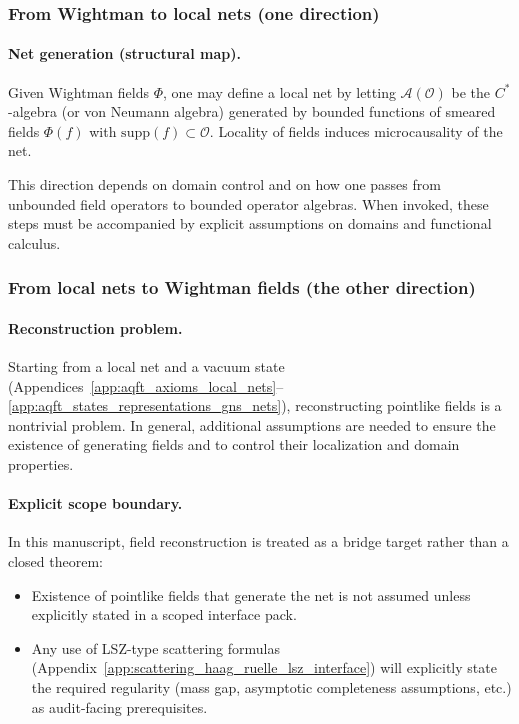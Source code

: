 \subsubsection{From Wightman to local nets (one direction)}
\paragraph{Net generation (structural map).}
Given Wightman fields $\Phi$, one may define a local net by letting $\mathcal{A}(\mathcal{O})$ be the $C^\ast$-algebra (or von Neumann algebra) generated by bounded functions of smeared fields $\Phi(f)$ with $\mathrm{supp}(f)\subset\mathcal{O}$.
Locality of fields induces microcausality of the net.

\AuditTag This direction depends on domain control and on how one passes from unbounded field operators to bounded operator algebras.
When invoked, these steps must be accompanied by explicit assumptions on domains and functional calculus.

\subsubsection{From local nets to Wightman fields (the other direction)}
\paragraph{Reconstruction problem.}
Starting from a local net and a vacuum state (Appendices~\ref{app:aqft_axioms_local_nets}--\ref{app:aqft_states_representations_gns_nets}), reconstructing pointlike fields is a nontrivial problem.
In general, additional assumptions are needed to ensure the existence of generating fields and to control their localization and domain properties.

\paragraph{Explicit scope boundary.}
\AuditTag In this manuscript, field reconstruction is treated as a bridge target rather than a closed theorem:
\begin{itemize}
\item Existence of pointlike fields that generate the net is not assumed unless explicitly stated in a scoped interface pack.
\item Any use of LSZ-type scattering formulas (Appendix~\ref{app:scattering_haag_ruelle_lsz_interface}) will explicitly state the required regularity (mass gap, asymptotic completeness assumptions, etc.) as audit-facing prerequisites.
\end{itemize}

